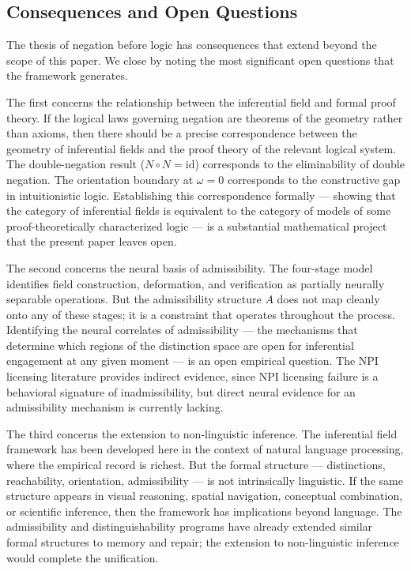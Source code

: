 \documentclass[12pt]{article}
\theoremstyle{remark}
\begin{document}
\subsection{Consequences and Open Questions}

The thesis of negation before logic has consequences that extend beyond
the scope of this paper. We close by noting the most significant open
questions that the framework generates.

The first concerns the relationship between the inferential field and
formal proof theory. If the logical laws governing negation are theorems
of the geometry rather than axioms, then there should be a precise
correspondence between the geometry of inferential fields and the proof
theory of the relevant logical system. The double-negation result
($N \circ N = \mathrm{id}$) corresponds to the eliminability of double
negation. The orientation boundary at $\omega = 0$ corresponds to the
constructive gap in intuitionistic logic. Establishing this
correspondence formally --- showing that the category of inferential
fields is equivalent to the category of models of some proof-theoretically
characterized logic --- is a substantial mathematical project that the
present paper leaves open.

The second concerns the neural basis of admissibility. The four-stage
model identifies field construction, deformation, and verification as
partially neurally separable operations. But the admissibility structure
$A$ does not map cleanly onto any of these stages; it is a constraint
that operates throughout the process. Identifying the neural correlates
of admissibility --- the mechanisms that determine which regions of the
distinction space are open for inferential engagement at any given moment
--- is an open empirical question. The NPI licensing literature provides
indirect evidence, since NPI licensing failure is a behavioral signature
of inadmissibility, but direct neural evidence for an admissibility
mechanism is currently lacking.

The third concerns the extension to non-linguistic inference. The
inferential field framework has been developed here in the context of
natural language processing, where the empirical record is richest. But
the formal structure --- distinctions, reachability, orientation,
admissibility --- is not intrinsically linguistic. If the same structure
appears in visual reasoning, spatial navigation, conceptual combination,
or scientific inference, then the framework has implications beyond
language. The admissibility and distinguishability programs have already
extended similar formal structures to memory and repair; the extension
to non-linguistic inference would complete the unification.
\end{document}
